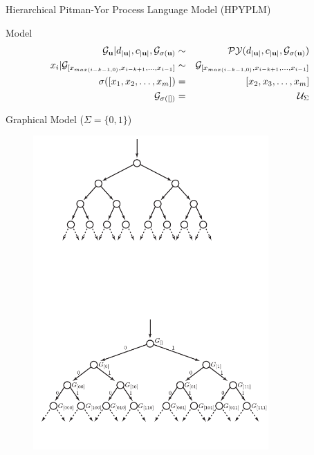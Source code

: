 \documentclass{beamer}
\newcommand{\G}{\mathcal{G}}
\newcommand{\PY}{\mathcal{P}\mathcal{Y}}
\newcommand{\bu}{{\bf u}}
\begin{document}
\begin{frame}[t]{Hierarchical Pitman-Yor Process Language Model (HPYPLM)\cite{teh2006a}}
	\begin{block}{Model}
		\vspace{-.5cm}
		\begin{eqnarray*}
			\G_{{\bf u}} | d_{| \bu |}, c_{| \bu |}, \G_{\sigma(\bu)} &\sim& \PY(d_{| \bu |}, c_{| \bu |}, \G_{\sigma(\bu)}) \\
			x_i | \G_{[x_{max({i-k-1,0})}, x_{i-k+1}, \ldots, x_{i-1}]} &\sim& \G_{[x_{max({i-k-1,0})}, x_{i-k+1}, \ldots, x_{i-1}]}\\
			\sigma([x_1, x_2, \ldots, x_m]) &=& [x_2, x_3, \ldots, x_m]\\
			\G_{\sigma([])} &=& \mathcal{U}_\Sigma
		\end{eqnarray*}
	\end{block}
\end{frame}


\begin{frame}{Graphical Model ($\Sigma = \{0,1\}$)}
\begin{figure}[t]
		\begin{center}
			\includegraphics[width = 9cm, trim = 1cm 1cm 1cm 10cm]{../figs/base.pdf}
		\end{center}
	\end{figure}
\end{frame}
\end{document}
